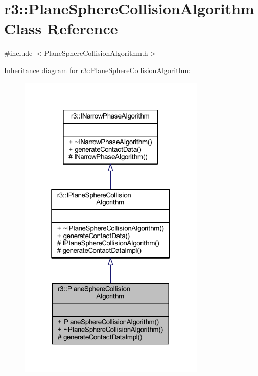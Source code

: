 \hypertarget{classr3_1_1_plane_sphere_collision_algorithm}{}\section{r3\+:\+:Plane\+Sphere\+Collision\+Algorithm Class Reference}
\label{classr3_1_1_plane_sphere_collision_algorithm}


{\ttfamily \#include $<$Plane\+Sphere\+Collision\+Algorithm.\+h$>$}



Inheritance diagram for r3\+:\+:Plane\+Sphere\+Collision\+Algorithm\+:\nopagebreak
\begin{figure}[H]
\begin{center}
\leavevmode
\includegraphics[width=253pt]{classr3_1_1_plane_sphere_collision_algorithm__inherit__graph}
\end{center}
\end{figure}


